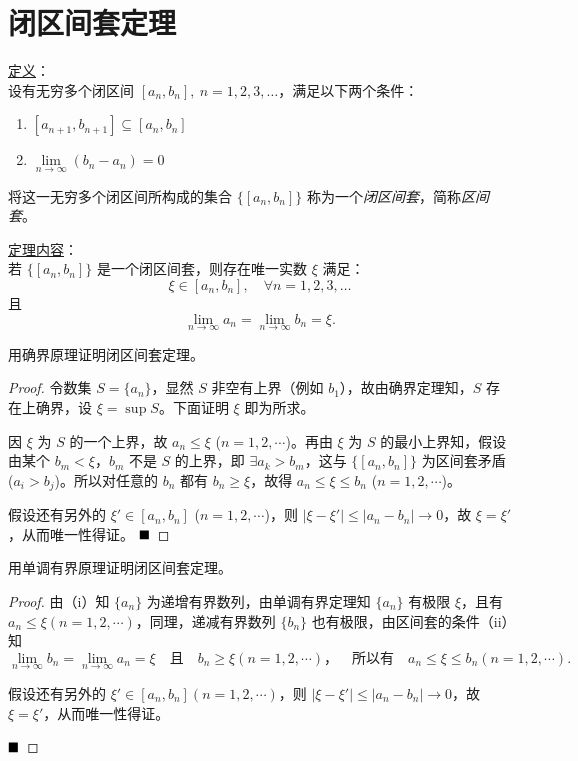 \newpage


\section{闭区间套定理}

\begin{theorem*}[闭区间套定理]
    \underline{定义}：\\
    设有无穷多个闭区间 \( [a_n, b_n],\ n = 1, 2, 3, \ldots \)，满足以下两个条件：
    \begin{enumerate}
        \item \( [a_{n+1}, b_{n+1}] \subseteq [a_n, b_n] \)
        \item \( \lim\limits_{n \to \infty} (b_n - a_n) = 0 \)
    \end{enumerate}
    将这一无穷多个闭区间所构成的集合 \(\{[a_n, b_n]\}\) 称为一个\emph{闭区间套}，简称\emph{区间套}。
    
    \underline{定理内容}：\\
    若 \(\{[a_n, b_n]\}\) 是一个闭区间套，则存在唯一实数 \(\xi\) 满足：
    \[
    \xi \in [a_n, b_n], \quad \forall n = 1, 2, 3, \ldots
    \]
    且
    \[
    \lim_{n \to \infty} a_n = \lim_{n \to \infty} b_n = \xi.
    \]
\end{theorem*}

\begin{problem}
    用确界原理证明闭区间套定理。
\end{problem}

\begin{proof}
    令数集 $S = \{a_n\}$，显然 $S$ 非空有上界（例如 $b_1$），故由确界定理知，$S$ 存在上确界，设 $\xi = \sup S$。下面证明 $\xi$ 即为所求。
    
    因 $\xi$ 为 $S$ 的一个上界，故 $a_n \leq \xi$ ($n=1,2,\cdots$)。再由 $\xi$ 为 $S$ 的最小上界知，假设由某个 $b_m < \xi$，$b_m$ 不是 $S$ 的上界，即 $\exists a_k > b_m$，这与 $\{[a_n,b_n]\}$ 为区间套矛盾 ($a_i > b_j$)。所以对任意的 $b_n$ 都有 $b_n \geq \xi$，故得 $a_n \leq \xi \leq b_n$ ($n=1,2,\cdots$)。
    
    假设还有另外的 $\xi' \in [a_n,b_n]$ ($n=1,2,\cdots$)，则 $|\xi - \xi'| \leq |a_n - b_n| \to 0$，故 $\xi = \xi'$，从而唯一性得证。
    $\hfill \blacksquare$
\end{proof}

\begin{problem}
    用单调有界原理证明闭区间套定理。
\end{problem}

\begin{proof}
    由（i）知 $\{a_n\}$ 为递增有界数列，由单调有界定理知 $\{a_n\}$ 有极限 $\xi$，且有 $a_n \leq \xi (n=1,2,\cdots)$，同理，递减有界数列 $\{b_n\}$ 也有极限，由区间套的条件（ii）知
    $
    \lim\limits_{n \to \infty} b_n = \lim\limits_{n \to \infty} a_n = \xi \quad \text{且} \quad b_n \geq \xi (n=1,2,\cdots)，\quad \text{所以有} \quad a_n \leq \xi \leq b_n (n=1,2,\cdots).
    $
    
    假设还有另外的 $\xi' \in [a_n, b_n] (n=1,2,\cdots)$，则 $|\xi - \xi'| \leq |a_n - b_n| \to 0$，故 $\xi = \xi'$，从而唯一性得证。
    
    $\hfill \blacksquare$
\end{proof}

